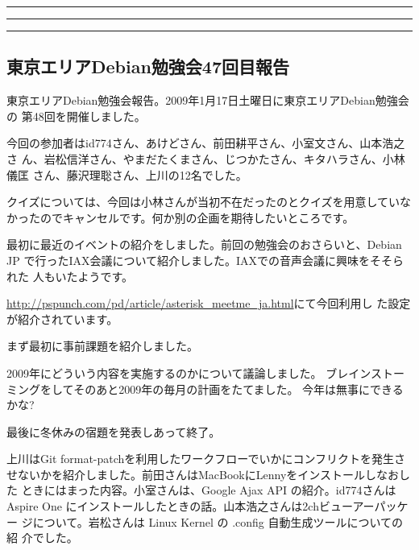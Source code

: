 \documentclass[mingoth,a4paper]{jsarticle}
\begin{document}
\newpage

\begin{minipage}[b]{0.2\hsize}
 \colorbox{titleback}{}
\end{minipage}
\begin{minipage}[b]{0.8\hsize}
\hrule
\vspace{2mm}
\hrule
%
%
\setcounter{tocdepth}{1}
\tableofcontents
\vspace{2mm}
\hrule
\end{minipage}



\subsection{東京エリアDebian勉強会47回目報告}

東京エリアDebian勉強会報告。2009年1月17日土曜日に東京エリアDebian勉強会の
第48回を開催しました。

今回の参加者はid774さん、あけどさん、前田耕平さん、小室文さん、山本浩之さ
ん、岩松信洋さん、やまだたくまさん、じつかたさん、キタハラさん、小林儀匡
さん、藤沢理聡さん、上川の12名でした。

クイズについては、今回は小林さんが当初不在だったのとクイズを用意していな
かったのでキャンセルです。何か別の企画を期待したいところです。

最初に最近のイベントの紹介をしました。前回の勉強会のおさらいと、Debian
JP で行ったIAX会議について紹介しました。IAXでの音声会議に興味をそそられた
人もいたようです。

\url{http://pspunch.com/pd/article/asterisk_meetme_ja.html}にて今回利用し
た設定が紹介されています。

まず最初に事前課題を紹介しました。

2009年にどういう内容を実施するのかについて議論しました。
ブレインストーミングをしてそのあと2009年の毎月の計画をたてました。
今年は無事にできるかな?

最後に冬休みの宿題を発表しあって終了。

上川はGit format-patchを利用したワークフローでいかにコンフリクトを発生さ
せないかを紹介しました。前田さんはMacBookにLennyをインストールしなおした
ときにはまった内容。小室さんは、Google Ajax API の紹介。id774さんは
Aspire One にインストールしたときの話。山本浩之さんは2chビューアーパッケー
ジについて。岩松さんは Linux Kernel の .config 自動生成ツールについての紹
介でした。
\end{document}
